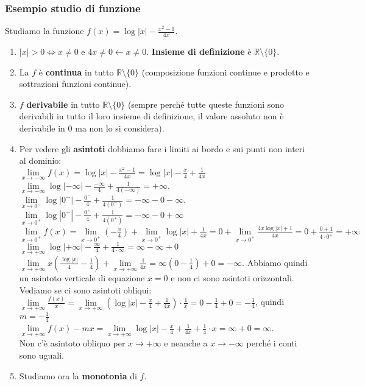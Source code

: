 \subsubsection{Esempio studio di funzione}
\begin{example}
Studiamo la funzione $f(x) = \log|x| - \frac{x^2 - 1}{4x}$.
\begin{enumerate}
    \item $|x| > 0 \Longleftrightarrow x\neq 0$ e $4x \neq 0 \longleftarrow x \neq 0$. \textbf{Insieme di definizione} è $\mathbb{R} \setminus \{0\}$.
    \item La $f$ è \textbf{continua} in tutto $\mathbb{R} \setminus \{0\}$ (composizione funzioni continue e prodotto e sottrazioni funzioni continue).
    \item $f$ \textbf{derivabile} in tutto $\mathbb{R} \setminus \{0\}$ (sempre perché tutte queste funzioni sono derivabili in tutto il loro insieme di definizione, il valore assoluto non è derivabile in 0 ma non lo si considera).
    \item Per vedere gli \textbf{asintoti} dobbiamo fare i limiti ai bordo e sui punti non interi al dominio:\\
    $\lim\limits_{x\to -\infty}f(x) = \log|x| - \frac{x^2 -1}{4x} = \log|x| - \frac{x}{4} + \frac{1}{4x}$ \hspace{.5cm} $\lim\limits_{x\to -\infty}\log|-\infty| - \frac{-\infty}{4} + \frac{1}{4(-\infty)} = + \infty$.\\
    $\lim\limits_{x\to 0^-}\log|0^-| - \frac{0^-}{4} + \frac{1}{4(0^-)} = -\infty - 0 - \infty$. \hspace{.5cm} 
    $\lim\limits_{x\to 0^+}\log|0^+| - \frac{0^+}{4} + \frac{1}{4(0^+)} = -\infty - 0 + \infty$\\
    $\lim\limits_{x\to 0^+}f(x) = \lim\limits_{x\to 0^+}(-\frac{x}{4}) + \lim\limits_{x\to 0^+}\log|x| + \frac{1}{4x} = 0 + \lim\limits_{x\to 0^+}\frac{4x\log|x| + 1}{4x} = 0 + \frac{0+1}{4 \cdot 0^+} = +\infty$\\
    $\lim\limits_{x\to +\infty} \log|+\infty| - \frac{\infty}{4} + \frac{1}{4 \cdot \infty} = \infty - \infty + 0$\\
    $\lim\limits_{x\to +\infty} x(\frac{\log|x|}{4} - \frac{1}{4}) + \lim\limits_{x\to +\infty} \frac{1}{4x} = \infty(0 - \frac{1}{4}) + 0 = -\infty.$
    Abbiamo quindi un asintoto verticale di equazione $x=0$ e non ci sono asintoti orizzontali. Vediamo se ci sono asintoti obliqui:
    $\lim\limits_{x\to +\infty}\frac{f(x)}{x} = \lim\limits_{x\to +\infty}(\log|x| -\frac{x}{4} + \frac{1}{4x}) \cdot \frac{1}{x} = 0 - \frac{1}{4} + 0 = -\frac{1}{4}$, quindi $m= -\frac{1}{4}$\\
    $\lim\limits_{x\to +\infty}f(x) -mx = \lim\limits_{x\to +\infty} \log|x| - \frac{x}{4} + \frac{1}{4x} + \frac{1}{4}\cdot x = \infty + 0 = \infty$. \\
    Non c'è asintoto obliquo per $x\to +\infty$ e neanche a $x\to -\infty$ perché i conti sono uguali.
    \item Studiamo ora la \textbf{monotonia} di $f$.
    

\end{enumerate}
\end{example}
